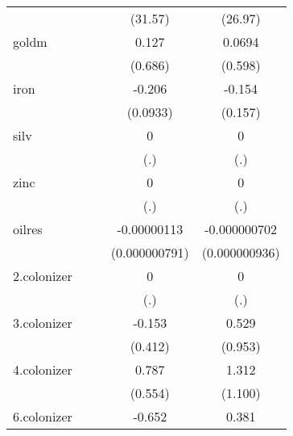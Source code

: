 {\begin{tabular}{l*{4}{c}}
            &                     &                     &     (31.57)         &     (26.97)         \\
[1em]
goldm       &                     &                     &       0.127         &      0.0694         \\
            &                     &                     &     (0.686)         &     (0.598)         \\
[1em]
iron        &                     &                     &      -0.206\sym{*}  &      -0.154         \\
            &                     &                     &    (0.0933)         &     (0.157)         \\
[1em]
silv        &                     &                     &           0         &           0         \\
            &                     &                     &         (.)         &         (.)         \\
[1em]
zinc        &                     &                     &           0         &           0         \\
            &                     &                     &         (.)         &         (.)         \\
[1em]
oilres      &                     &                     & -0.00000113         &-0.000000702         \\
            &                     &                     &(0.000000791)         &(0.000000936)         \\
[1em]
2.colonizer &                     &                     &           0         &           0         \\
            &                     &                     &         (.)         &         (.)         \\
[1em]
3.colonizer &                     &                     &      -0.153         &       0.529         \\
            &                     &                     &     (0.412)         &     (0.953)         \\
[1em]
4.colonizer &                     &                     &       0.787         &       1.312         \\
            &                     &                     &     (0.554)         &     (1.100)         \\
[1em]
6.colonizer &                     &                     &      -0.652\sym{**} &       0.381         \\

\end{tabular}}
